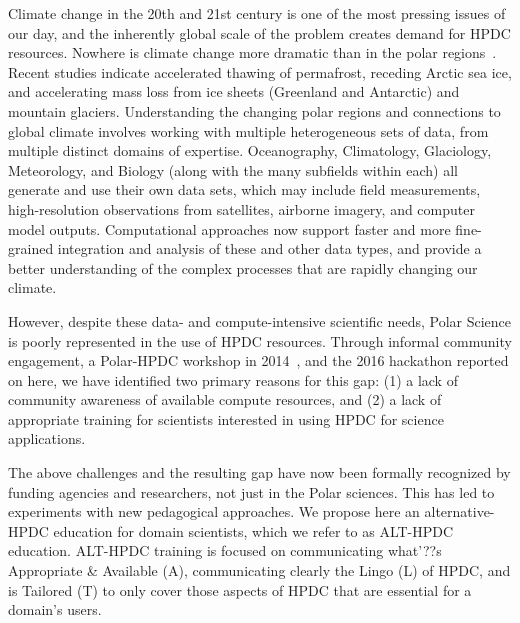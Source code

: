 \documentclass[conference]{IEEEtran}
\begin{document}
Climate change in the 20th and 21st century is one of the most pressing issues of our day, and the inherently global scale of the problem creates demand for HPDC resources. Nowhere is climate change more dramatic than in the polar regions~\cite{Nelson2007}. Recent studies indicate accelerated thawing of permafrost, receding Arctic sea ice, and accelerating mass loss from ice sheets (Greenland and Antarctic) and mountain glaciers. Understanding the changing polar regions and connections to global climate involves working with multiple heterogeneous sets of data, from multiple distinct domains of expertise. Oceanography, Climatology, Glaciology, Meteorology, and Biology (along with the many subfields within each) all generate and use their own data sets, which may include field measurements, high-resolution observations from satellites, airborne imagery, and computer model outputs. Computational approaches now support faster and more fine-grained integration and analysis of these and other data types, and provide a better understanding of the complex processes that are rapidly changing our climate.  

However, despite these data- and compute-intensive scientific needs, Polar Science is poorly represented in the use of HPDC resources. Through informal community engagement, a Polar-HPDC workshop in 2014~\cite{Workshop2014}, and the 2016 hackathon reported on here, we have identified two primary reasons for this gap: (1) a lack of community awareness of available compute resources, and (2) a lack of appropriate training for scientists interested in using HPDC for science applications. 

The above challenges and the resulting gap have now been formally recognized by funding agencies and researchers, not just in the Polar sciences. This has led to experiments with new pedagogical approaches. We propose here an alternative-HPDC education for domain scientists, which we refer to as ALT-HPDC education. ALT-HPDC training is focused on communicating what'??s Appropriate \& Available (A), communicating clearly the Lingo (L) of HPDC, and is Tailored (T) to only cover those aspects of HPDC that are essential for a domain's users. 
\end{document}
